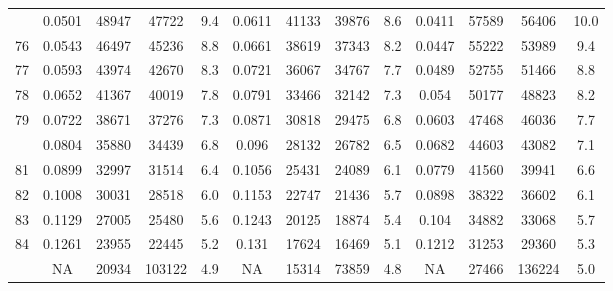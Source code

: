 \documentclass[
  14pt,
]{article}
\begin{document}
\begin{longtable}[t]{lcccccccccccc}
\addlinespace
75 & 0.0501 & 48947 & 47722 & 9.4 & 0.0611 & 41133 & 39876 & 8.6 & 0.0411 & 57589 & 56406 & 10.0\\
76 & 0.0543 & 46497 & 45236 & 8.8 & 0.0661 & 38619 & 37343 & 8.2 & 0.0447 & 55222 & 53989 & 9.4\\
77 & 0.0593 & 43974 & 42670 & 8.3 & 0.0721 & 36067 & 34767 & 7.7 & 0.0489 & 52755 & 51466 & 8.8\\
78 & 0.0652 & 41367 & 40019 & 7.8 & 0.0791 & 33466 & 32142 & 7.3 & 0.054 & 50177 & 48823 & 8.2\\
79 & 0.0722 & 38671 & 37276 & 7.3 & 0.0871 & 30818 & 29475 & 6.8 & 0.0603 & 47468 & 46036 & 7.7\\
\addlinespace
80 & 0.0804 & 35880 & 34439 & 6.8 & 0.096 & 28132 & 26782 & 6.5 & 0.0682 & 44603 & 43082 & 7.1\\
81 & 0.0899 & 32997 & 31514 & 6.4 & 0.1056 & 25431 & 24089 & 6.1 & 0.0779 & 41560 & 39941 & 6.6\\
82 & 0.1008 & 30031 & 28518 & 6.0 & 0.1153 & 22747 & 21436 & 5.7 & 0.0898 & 38322 & 36602 & 6.1\\
83 & 0.1129 & 27005 & 25480 & 5.6 & 0.1243 & 20125 & 18874 & 5.4 & 0.104 & 34882 & 33068 & 5.7\\
84 & 0.1261 & 23955 & 22445 & 5.2 & 0.131 & 17624 & 16469 & 5.1 & 0.1212 & 31253 & 29360 & 5.3\\
\addlinespace
85 & NA & 20934 & 103122 & 4.9 & NA & 15314 & 73859 & 4.8 & NA & 27466 & 136224 & 5.0\\*
\end{longtable}
\end{document}
